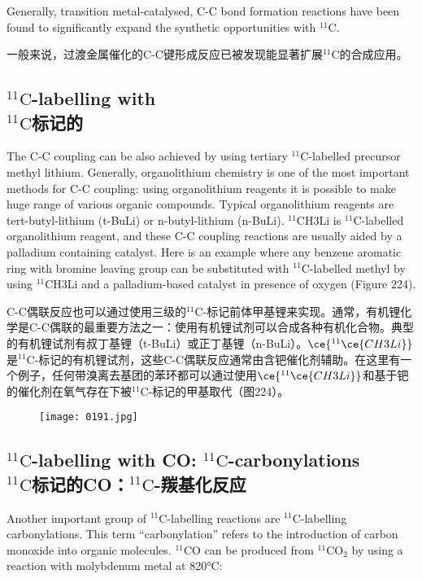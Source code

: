 \documentclass[dvipsnames, svgnames,a4paper,11pt]{article}
\begin{document}
Generally, transition metal-catalysed, C-C bond formation reactions have been found
to significantly expand the synthetic opportunities with ${}^\mathrm{11}\mathrm{C}$.

一般来说，过渡金属催化的C-C键形成反应已被发现能显著扩展${}^\mathrm{11}\mathrm{C}$的合成应用。

\subsection{${}^\mathrm{11}\mathrm{C}$-labelling with  \\${}^\mathrm{11}\mathrm{C}$标记的}  
The C-C coupling can be also achieved by using tertiary ${}^\mathrm{11}\mathrm{C}$-labelled precursor methyl lithium. Generally, organolithium chemistry is one of the most important methods for C-C coupling: using organolithium reagents it is possible to make huge range of various organic compounds. Typical organolithium reagents are tert-butyl-lithium (t-BuLi) or n-butyl-lithium (n-BuLi). ${}^\mathrm{11}\mathrm{C}$H3Li is ${}^\mathrm{11}\mathrm{C}$-labelled organolithium reagent, and these C-C coupling reactions are usually aided by a palladium containing catalyst. Here is an example where any benzene aromatic ring with bromine leaving group can be substituted with ${}^\mathrm{11}\mathrm{C}$-labelled methyl by using ${}^\mathrm{11}\mathrm{C}$H3Li and a palladium-based catalyst in presence of oxygen (Figure 224).

C-C偶联反应也可以通过使用三级的${}^\mathrm{11}\mathrm{C}$-标记前体甲基锂来实现。通常，有机锂化学是C-C偶联的最重要方法之一：使用有机锂试剂可以合成各种有机化合物。典型的有机锂试剂有叔丁基锂（t-BuLi）或正丁基锂（n-BuLi）。\(\ce{^{11}\ce{CH3Li}}\)是${}^\mathrm{11}\mathrm{C}$-标记的有机锂试剂，这些C-C偶联反应通常由含钯催化剂辅助。在这里有一个例子，任何带溴离去基团的苯环都可以通过使用\(\ce{^{11}\ce{CH3Li}}\)和基于钯的催化剂在氧气存在下被${}^\mathrm{11}\mathrm{C}$-标记的甲基取代（图224）。

\begin{figure}[h]
	\centering
    \texttt{[image: 0191.jpg]}  
     \label{fig224}
\end{figure}

\subsection{${}^\mathrm{11}\mathrm{C}$-labelling with CO: ${}^\mathrm{11}\mathrm{C}$-carbonylations \\${}^\mathrm{11}\mathrm{C}$标记的CO：${}^\mathrm{11}\mathrm{C}$-羰基化反应}  
Another important group of ${}^\mathrm{11}\mathrm{C}$-labelling reactions are ${}^\mathrm{11}\mathrm{C}$-labelling carbonylations. This term “carbonylation” refers to the introduction of carbon monoxide into organic molecules. ${}^\mathrm{11}\mathrm{C}$O can be produced from ${}^\mathrm{11}\mathrm{CO_2}$ by using a reaction with molybdenum metal at 820°C:  
\end{document}
